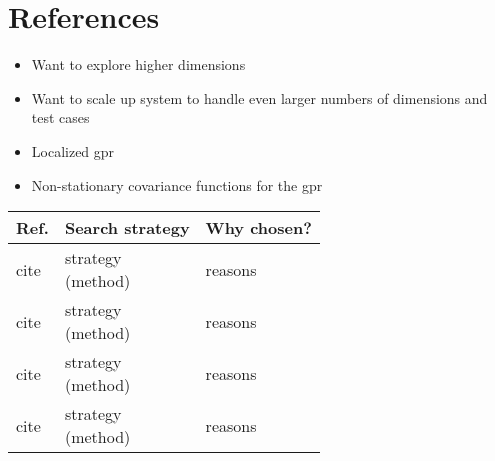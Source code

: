 \documentclass[oneside, notitlepage, twocolumn]{scrartcl}
\newcommand{\tableheadline}[1]{\textbf{#1}}
\newcommand{\draft}[1]{\textcolor{red}{\textit{#1}}}
\begin{document}
\section{References}
\begingroup
\renewcommand{\section}[2]{}%
\nocite{*}
\printbibliography%
\endgroup

\section{Related Work}
\draft{%
    \begin{itemize}
        \item Want to explore higher dimensions
        \item Want to scale up system to handle even larger numbers of dimensions and test cases
        \item Localized \gls{gpr}
        \item Non-stationary covariance functions for the \gls{gpr}
    \end{itemize}
}
\begin{adjustbox}{angle=90}
\begin{tabularx}{\textwidth}{llX}
    \tableheadline{Ref.} & \tableheadline{Search strategy} & \tableheadline{Why chosen?}\\
    \midrule
    cite & \makecell{strategy\\(method)} & reasons\\
    \midrule
    cite & \makecell{strategy\\(method)} & reasons\\
    \midrule
    cite & \makecell{strategy\\(method)}& reasons\\
    \midrule
    cite & \makecell{strategy\\(method)}& reasons\\
\end{tabularx}
\end{adjustbox}
\end{document}
